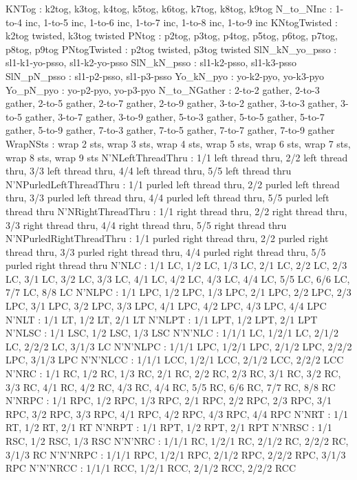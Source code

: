 KNTog : k2tog, k3tog, k4tog, k5tog, k6tog, k7tog, k8tog, k9tog
N_to_NInc :  1-to-4 inc, 1-to-5 inc, 1-to-6 inc, 1-to-7 inc, 1-to-8 inc, 1-to-9 inc
KNtogTwisted :  k2tog twisted, k3tog twisted
PNtog :  p2tog, p3tog, p4tog, p5tog, p6tog, p7tog, p8tog, p9tog
PNtogTwisted :  p2tog twisted, p3tog twisted
SlN_kN_yo_psso :  sl1-k1-yo-psso, sl1-k2-yo-psso
SlN_kN_psso :  sl1-k2-psso, sl1-k3-psso
SlN_pN_psso :  sl1-p2-psso, sl1-p3-psso
Yo_kN_pyo :  yo-k2-pyo, yo-k3-pyo
Yo_pN_pyo :  yo-p2-pyo, yo-p3-pyo
N_to_NGather :  2-to-2 gather, 2-to-3 gather, 2-to-5 gather, 2-to-7 gather, 2-to-9 gather, 3-to-2 gather, 3-to-3 gather, 3-to-5 gather, 3-to-7 gather, 3-to-9 gather, 5-to-3 gather, 5-to-5 gather, 5-to-7 gather, 5-to-9 gather, 7-to-3 gather, 7-to-5 gather, 7-to-7 gather, 7-to-9 gather
WrapNSts :  wrap 2 sts, wrap 3 sts, wrap 4 sts, wrap 5 sts, wrap 6 sts, wrap 7 sts, wrap 8 sts, wrap 9 sts
N'NLeftThreadThru :  1/1 left thread thru, 2/2 left thread thru, 3/3 left thread thru, 4/4 left thread thru, 5/5 left thread thru
N'NPurledLeftThreadThru :  1/1 purled left thread thru, 2/2 purled left thread thru, 3/3 purled left thread thru, 4/4 purled left thread thru, 5/5 purled left thread thru
N'NRightThreadThru :  1/1 right thread thru, 2/2 right thread thru, 3/3 right thread thru, 4/4 right thread thru, 5/5 right thread thru 
N'NPurledRightThreadThru :  1/1 purled right thread thru, 2/2 purled right thread thru, 3/3 purled right thread thru, 4/4 purled right thread thru, 5/5 purled right thread thru
N'NLC :  1/1 LC, 1/2 LC, 1/3 LC, 2/1 LC, 2/2 LC, 2/3 LC, 3/1 LC, 3/2 LC, 3/3 LC, 4/1 LC, 4/2 LC, 4/3 LC, 4/4 LC, 5/5 LC, 6/6 LC, 7/7 LC, 8/8 LC
N'NLPC :  1/1 LPC, 1/2 LPC, 1/3 LPC, 2/1 LPC, 2/2 LPC, 2/3 LPC, 3/1 LPC, 3/2 LPC, 3/3 LPC, 4/1 LPC, 4/2 LPC, 4/3 LPC, 4/4 LPC
N'NLT :  1/1 LT, 1/2 LT, 2/1 LT
N'NLPT :  1/1 LPT, 1/2 LPT, 2/1 LPT
N'NLSC :  1/1 LSC, 1/2 LSC, 1/3 LSC
N'N'NLC :  1/1/1 LC, 1/2/1 LC, 2/1/2 LC, 2/2/2 LC, 3/1/3 LC
N'N'NLPC :  1/1/1 LPC, 1/2/1 LPC, 2/1/2 LPC, 2/2/2 LPC, 3/1/3 LPC
N'N'NLCC :  1/1/1 LCC, 1/2/1 LCC, 2/1/2 LCC, 2/2/2 LCC
N'NRC :  1/1 RC, 1/2 RC, 1/3 RC, 2/1 RC, 2/2 RC, 2/3 RC, 3/1 RC, 3/2 RC, 3/3 RC, 4/1 RC, 4/2 RC, 4/3 RC, 4/4 RC, 5/5 RC, 6/6 RC, 7/7 RC, 8/8 RC
N'NRPC :  1/1 RPC, 1/2 RPC, 1/3 RPC, 2/1 RPC, 2/2 RPC, 2/3 RPC, 3/1 RPC, 3/2 RPC, 3/3 RPC, 4/1 RPC, 4/2 RPC, 4/3 RPC, 4/4 RPC
N'NRT :  1/1 RT, 1/2 RT, 2/1 RT
N'NRPT :  1/1 RPT, 1/2 RPT, 2/1 RPT
N'NRSC :  1/1 RSC, 1/2 RSC, 1/3 RSC
N'N'NRC :  1/1/1 RC, 1/2/1 RC, 2/1/2 RC, 2/2/2 RC, 3/1/3 RC
N'N'NRPC :  1/1/1 RPC, 1/2/1 RPC, 2/1/2 RPC, 2/2/2 RPC, 3/1/3 RPC
N'N'NRCC :  1/1/1 RCC, 1/2/1 RCC, 2/1/2 RCC, 2/2/2 RCC
